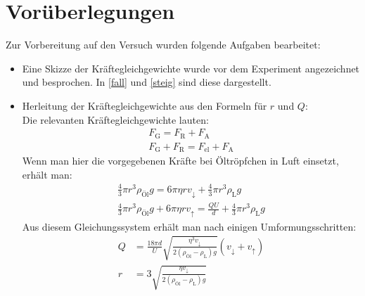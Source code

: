 \documentclass[
	a4paper,
	12pt,
	pagesize,
	ngerman
]{scrartcl}
\begin{document}
	\section{Vorüberlegungen}
	Zur Vorbereitung auf den Versuch wurden folgende Aufgaben bearbeitet:
	\begin{itemize}
		\item Eine Skizze der Kräftegleichgewichte wurde vor dem Experiment angezeichnet und besprochen. In \cref{fall} und \cref{steig} sind diese dargestellt.
		\item Herleitung der Kräftegleichgewichte aus den Formeln für $ r $ und $ Q $: \\
		Die relevanten Kräftegleichgewichte lauten:
		\begin{align*}
			F_\text{G}=F_\text{R}+F_\text{A}\\
			F_\text{G}+F_\text{R}=F_\text{el}+F_\text{A}
		\end{align*}
		Wenn man hier die vorgegebenen Kräfte bei Öltröpfchen in Luft einsetzt, erhält man:
		\begin{align*}
			\frac{4}{3}\pi r^3 \rho_\text{Öl} g = 6 \pi \eta r v_\downarrow + \frac{4}{3}\pi r^3 \rho_\text{L}g\\
			\frac{4}{3}\pi r^3 \rho_\text{Öl} g + 6 \pi \eta r v_\uparrow = \frac{QU}{d} + \frac{4}{3}\pi r^3 \rho_\text{L}g
		\end{align*}
		Aus diesem Gleichungssystem erhält man nach einigen Umformungsschritten:
		\begin{align*}
			Q&=\frac{18 \pi d}{U} \sqrt{\frac{\eta^3 v_\downarrow}{2(\rho_\text{Öl}-\rho_\text{L})g}}(v_\downarrow + v_\uparrow)\\
			r&=3\sqrt{\frac{\eta v_\downarrow}{2(\rho_\text{Öl}-\rho_\text{L})g}}
		\end{align*}
		

\end{itemize}
\end{document}
